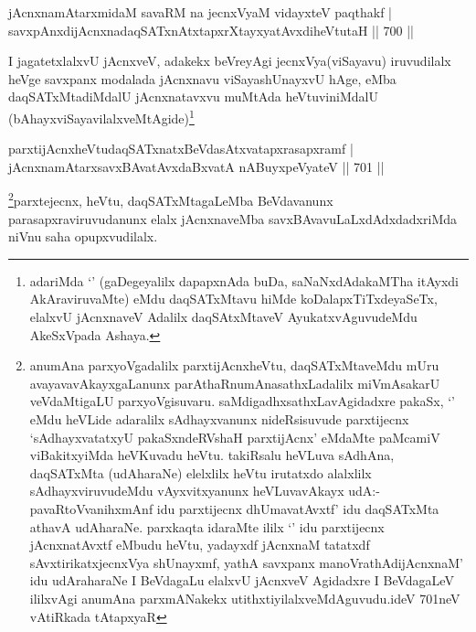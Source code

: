 
\begin{shl}
jAcnxnamAtarxmidaM savaRM na jecnxVyaM vidayxteV paqthakf | \\
savxpAnxdijAcnxnadaqSATxnAtxtapxrXtayxyatAvxdiheVtutaH \hfill||  700 ||  
\end{shl}

\begin{artha}
I jagatetxlalxvU jAcnxveV, adakekx beVreyAgi jecnxVya(viSayavu) iruvudilalx heVge savxpanx modalada jAcnxnavu viSayashUnayxvU hAge, eMba daqSATxMtadiMdalU jAcnxnatavxvu muMtAda heVtuviniMdalU (bAhayxviSayavilalxveMtAgide)\footnote{adariMda `\stext' (gaDegeyalilx dapapxnAda buDa, saNaNxdAdakaMTha itAyxdi AkAraviruvaMte) eMdu daqSATxMtavu hiMde koDalapxTiTxdeyaSeTx, elalxvU jAcnxnaveV Adalilx daqSAtxMtaveV AyukatxvAguvudeMdu AkeSxVpada Ashaya.}
\end{artha}


\begin{shl}
parxtijAcnxheVtudaqSATxnatxBeVdasAtxvatapxrasapxramf | \\
jAcnxnamAtarxsavxBAvatAvxdaBxvatA nABuyxpeVyateV \hfill||  701 ||  
\end{shl}

\begin{artha}
\footnote{anumAna parxyoVgadalilx parxtijAcnxheVtu, daqSATxMtaveMdu mUru avayavavAkayxgaLanunx parAthaRnumAnasathxLadalilx miVmAsakarU veVdaMtigaLU parxyoVgisuvaru. saMdigadhxsathxLavAgidadxre pakaSx, `\stext' eMdu heVLide adaralilx sAdhayxvanunx nideRsisuvude parxtijecnx `sAdhayxvatatxyU pakaSxndeRVshaH parxtijAcnx' eMdaMte paMcamiV viBakitxyiMda heVKuvadu heVtu. takiRsalu heVLuva sAdhAna, daqSATxMta (udAharaNe) elelxlilx heVtu irutatxdo alalxlilx sAdhayxviruvudeMdu vAyxvitxyanunx heVLuvavAkayx udA:-pavaRtoVvanihxmAnf idu parxtijecnx dhUmavatAvxtf' idu daqSATxMta athavA udAharaNe. parxkaqta idaraMte ililx `\stext' idu parxtijecnx jAcnxnatAvxtf eMbudu heVtu, yadayxdf jAcnxnaM tatatxdf sAvxtirikatxjecnxVya shUnayxmf, yathA savxpanx manoVrathAdijAcnxnaM' idu udAraharaNe I BeVdagaLu elalxvU jAcnxveV Agidadxre I BeVdagaLeV ililxvAgi anumAna parxmANakekx utithxtiyilalxveMdAguvudu.ideV 701neV vAtiRkada tAtapxyaR}parxtejecnx, heVtu, daqSATxMtagaLeMba BeVdavanunx parasapxraviruvudanunx elalx jAcnxnaveMba savxBAvavuLaLxdAdxdadxriMda niVnu saha opupxvudilalx.
\end{artha}

